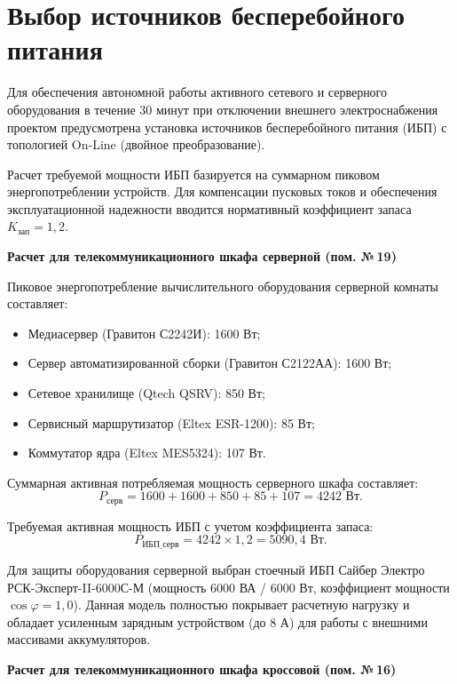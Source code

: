 \documentclass[a4paper,oneside,14pt]{extreport}
\begin{document}
\section{Выбор источников бесперебойного питания}

Для обеспечения автономной работы активного сетевого и серверного оборудования в течение 30 минут при отключении внешнего электроснабжения проектом предусмотрена установка источников бесперебойного питания (ИБП) с топологией On-Line (двойное преобразование). 

Расчет требуемой мощности ИБП базируется на суммарном пиковом энергопотреблении устройств. Для компенсации пусковых токов и обеспечения эксплуатационной надежности вводится нормативный коэффициент запаса $K_{\text{зап}} = 1{,}2$.

\textbf{Расчет для телекоммуникационного шкафа серверной (пом. №\,19)}

Пиковое энергопотребление вычислительного оборудования серверной комнаты составляет:
\begin{itemize}
    \item Медиасервер (Гравитон С2242И): 1600 Вт;
    \item Сервер автоматизированной сборки (Гравитон С2122АА): 1600 Вт;
    \item Сетевое хранилище (Qtech QSRV): 850 Вт;
    \item Сервисный маршрутизатор (Eltex ESR-1200): 85 Вт;
    \item Коммутатор ядра (Eltex MES5324): 107 Вт.
\end{itemize}

Суммарная активная потребляемая мощность серверного шкафа составляет:
\begin{equation}
    P_{\text{серв}} = 1600 + 1600 + 850 + 85 + 107 = 4242 \text{ Вт}.
\end{equation}

Требуемая активная мощность ИБП с учетом коэффициента запаса:
\begin{equation}
    P_{\text{ИБП\_серв}} = 4242 \times 1{,}2 = 5090{,}4 \text{ Вт}.
\end{equation}

Для защиты оборудования серверной выбран стоечный ИБП Сайбер Электро РСК-Эксперт-II-6000С-М (мощность 6000 ВА / 6000 Вт, коэффициент мощности $\cos\varphi = 1{,}0$). Данная модель полностью покрывает расчетную нагрузку и обладает усиленным зарядным устройством (до 8 А) для работы с внешними массивами аккумуляторов.

\textbf{Расчет для телекоммуникационного шкафа кроссовой (пом. №\,16)}
\end{document}
